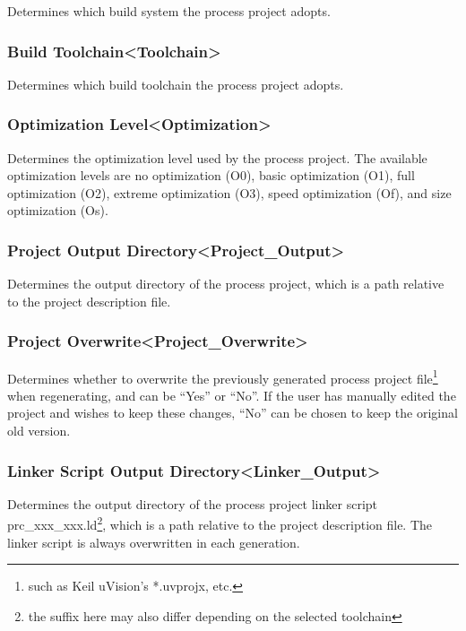 Determines which build system the process project adopts.

\subsubsection{Build Toolchain<Toolchain>{}}\label{subsubsec:5-3-14-5}

Determines which build toolchain the process project adopts.

\subsubsection{Optimization Level<Optimization>{}}\label{subsubsec:5-3-14-6}

Determines the optimization level used by the process project. The available optimization levels are no optimization (O0), basic optimization (O1), full optimization (O2), extreme optimization (O3), speed optimization (Of), and size optimization (Os).

\subsubsection{Project Output Directory<Project\_Output>{}}\label{subsubsec:5-3-14-7}

Determines the output directory of the process project, which is a path relative to the project description file.

\subsubsection{Project Overwrite<Project\_Overwrite>{}}\label{subsubsec:5-3-14-8}

Determines whether to overwrite the previously generated process project file\footnote{such as Keil uVision's *.uvprojx, etc.} when regenerating, and can be ``Yes'' or ``No''. If the user has manually edited the project and wishes to keep these changes, ``No'' can be chosen to keep the original old version.

\subsubsection{Linker Script Output Directory<Linker\_Output>{}}\label{subsubsec:5-3-14-9}

Determines the output directory of the process project linker script prc\_xxx\_xxx.ld\footnote{the suffix here may also differ depending on the selected toolchain}, which is a path relative to the project description file. The linker script is always overwritten in each generation.

